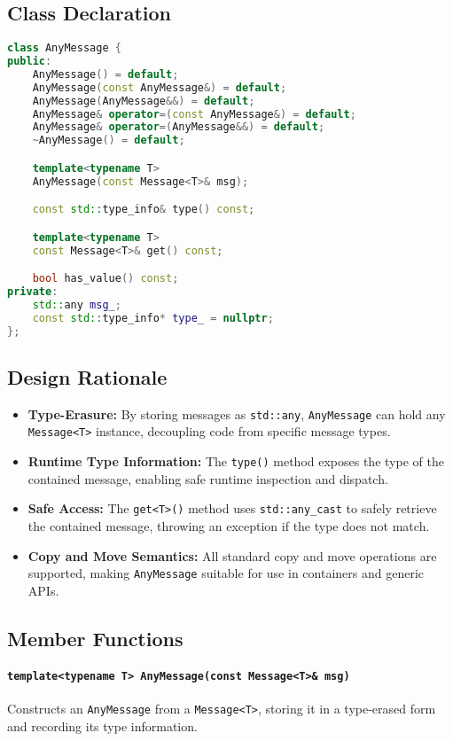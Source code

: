 \documentclass[12pt]{report}
\begin{document}
\subsection{Class Declaration}
\begin{lstlisting}[language=C++]
class AnyMessage {
public:
    AnyMessage() = default;
    AnyMessage(const AnyMessage&) = default;
    AnyMessage(AnyMessage&&) = default;
    AnyMessage& operator=(const AnyMessage&) = default;
    AnyMessage& operator=(AnyMessage&&) = default;
    ~AnyMessage() = default;

    template<typename T>
    AnyMessage(const Message<T>& msg);

    const std::type_info& type() const;

    template<typename T>
    const Message<T>& get() const;

    bool has_value() const;
private:
    std::any msg_;
    const std::type_info* type_ = nullptr;
};
\end{lstlisting}

\subsection{Design Rationale}
\begin{itemize}
    \item \textbf{Type-Erasure:} By storing messages as \texttt{std::any}, \texttt{AnyMessage} can hold any \texttt{Message<T>} instance, decoupling code from specific message types.
    \item \textbf{Runtime Type Information:} The \texttt{type()} method exposes the type of the contained message, enabling safe runtime inspection and dispatch.
    \item \textbf{Safe Access:} The \texttt{get<T>()} method uses \texttt{std::any\_cast} to safely retrieve the contained message, throwing an exception if the type does not match.
    \item \textbf{Copy and Move Semantics:} All standard copy and move operations are supported, making \texttt{AnyMessage} suitable for use in containers and generic APIs.
\end{itemize}

\subsection{Member Functions}
\paragraph{\texttt{template<typename T> AnyMessage(const Message<T>\& msg)}}
Constructs an \texttt{AnyMessage} from a \texttt{Message<T>}, storing it in a type-erased form and recording its type information.
\end{document}
